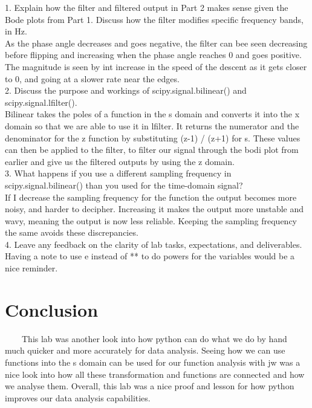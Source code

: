 \documentclass[11pt,a4]{article}
\begin{document}
1. Explain how the filter and filtered output in Part 2 makes sense given the Bode plots from Part 1. Discuss how the filter modifies specific frequency bands, in Hz.\\
As the phase angle decreases and goes negative, the filter can bee seen decreasing before flipping and increasing when the phase angle reaches 0 and goes positive. The magnitude is seen by int increase in the speed of the descent as it gets closer to 0, and going at a slower rate near the edges.\\
2. Discuss the purpose and workings of scipy.signal.bilinear() and scipy.signal.lfilter().\\
Bilinear takes the poles of a function in the s domain and converts it into the x domain so that we are able to use it in lfilter. It returns the numerator and the denominator for the z function by substituting (z-1) / (z+1) for s. These values can then be applied to the filter, to filter our signal through the bodi plot from earlier and give us the filtered outputs by using the z domain.\\
3. What happens if you use a different sampling frequency in scipy.signal.bilinear() than you used for the time-domain signal?\\
If I decrease the sampling frequency for the function the output becomes more noisy, and harder to decipher. Increasing it makes the output more unstable and wavy, meaning the output is now less reliable. Keeping the sampling frequency the same avoids these discrepancies.\\
4. Leave any feedback on the clarity of lab tasks, expectations, and deliverables.\\
Having a note to use e instead of ** to do powers for the variables would be a nice reminder.

\section{Conclusion}

\ \ \ \ This lab was another look into how python can do what we do by hand much quicker and more accurately for data analysis. Seeing how we can use functions into the s domain can be used for our function analysis with jw was a nice look into how all these transformation and functions are connected and how we analyse them. Overall, this lab was a nice proof and lesson for how python improves our data analysis capabilities.
\end{document}
